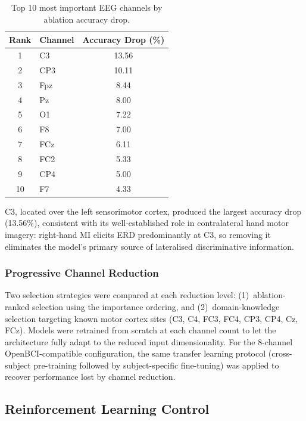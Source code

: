 \documentclass[12pt, a4paper]{article}
\begin{document}
\begin{table}[htbp]
\centering
\caption{Top 10 most important EEG channels by ablation accuracy drop.}
\label{tab:channel_importance}
\begin{tabular}{clc}
\toprule
\textbf{Rank} & \textbf{Channel} & \textbf{Accuracy Drop (\%)} \\
\midrule
1 & C3   & 13.56 \\
2 & CP3  & 10.11 \\
3 & Fpz  & 8.44 \\
4 & Pz   & 8.00 \\
5 & O1   & 7.22 \\
6 & F8   & 7.00 \\
7 & FCz  & 6.11 \\
8 & FC2  & 5.33 \\
9 & CP4  & 5.00 \\
10 & F7  & 4.33 \\
\bottomrule
\end{tabular}
\end{table}

C3, located over the left sensorimotor cortex, produced the largest accuracy drop (13.56\%), consistent with its well-established role in contralateral hand motor imagery: right-hand MI elicits ERD predominantly at C3, so removing it eliminates the model's primary source of lateralised discriminative information.

\subsubsection{Progressive Channel Reduction}

Two selection strategies were compared at each reduction level: (1)~ablation-ranked selection using the importance ordering, and (2)~domain-knowledge selection targeting known motor cortex sites (C3, C4, FC3, FC4, CP3, CP4, Cz, FCz). Models were retrained from scratch at each channel count to let the architecture fully adapt to the reduced input dimensionality. For the 8-channel OpenBCI-compatible configuration, the same transfer learning protocol (cross-subject pre-training followed by subject-specific fine-tuning) was applied to recover performance lost by channel reduction.

\subsection{Reinforcement Learning Control}
\end{document}
